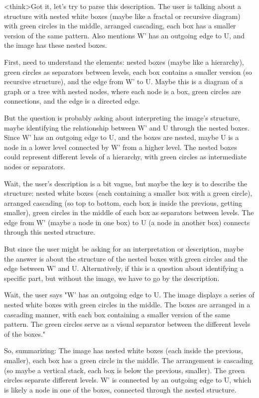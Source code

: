 <think>Got it, let's try to parse this description. The user is talking about a structure with nested white boxes (maybe like a fractal or recursive diagram) with green circles in the middle, arranged cascading, each box has a smaller version of the same pattern. Also mentions W' has an outgoing edge to U, and the image has these nested boxes. 

First, need to understand the elements: nested boxes (maybe like a hierarchy), green circles as separators between levels, each box contains a smaller version (so recursive structure), and the edge from W' to U. Maybe this is a diagram of a graph or a tree with nested nodes, where each node is a box, green circles are connections, and the edge is a directed edge. 

But the question is probably asking about interpreting the image's structure, maybe identifying the relationship between W' and U through the nested boxes. Since W' has an outgoing edge to U, and the boxes are nested, maybe U is a node in a lower level connected by W' from a higher level. The nested boxes could represent different levels of a hierarchy, with green circles as intermediate nodes or separators. 

Wait, the user's description is a bit vague, but maybe the key is to describe the structure: nested white boxes (each containing a smaller box with a green circle), arranged cascading (so top to bottom, each box is inside the previous, getting smaller), green circles in the middle of each box as separators between levels. The edge from W' (maybe a node in one box) to U (a node in another box) connects through this nested structure. 

But since the user might be asking for an interpretation or description, maybe the answer is about the structure of the nested boxes with green circles and the edge between W' and U. Alternatively, if this is a question about identifying a specific part, but without the image, we have to go by the description. 

Wait, the user says "W' has an outgoing edge to U. The image displays a series of nested white boxes with green circles in the middle. The boxes are arranged in a cascading manner, with each box containing a smaller version of the same pattern. The green circles serve as a visual separator between the different levels of the boxes." 

So, summarizing: The image has nested white boxes (each inside the previous, smaller), each box has a green circle in the middle. The arrangement is cascading (so maybe a vertical stack, each box is below the previous, smaller). The green circles separate different levels. W' is connected by an outgoing edge to U, which is likely a node in one of the boxes, connected through the nested structure. 

